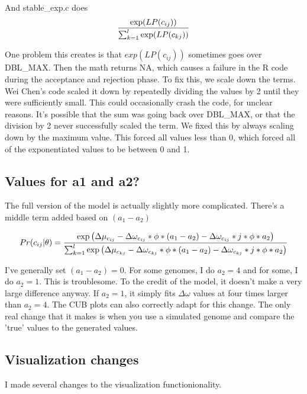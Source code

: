 And stable\_exp.c does
$$\frac{\hbox{exp}(LP(c_{ij}))}{\sum_{k=1}^l \hbox{exp}(LP(c_{kj}))}$$

One problem this creates is that $exp(LP(c_{ij}))$ sometimes goes over DBL\_MAX. Then the math returns NA, which causes a failure in the R code during the acceptance and rejection phase. To fix this, we scale down the terms. Wei Chen's code scaled it down by repeatedly dividing the values by 2  until they were sufficiently small. This could occasionally crash the code, for unclear reasons. It's possible that the sum was going back over DBL\_MAX, or that the division by 2 never successfully scaled the term. We fixed this by always scaling down by the maximum value. This forced all values less than 0, which forced all of the exponentiated values to be between 0 and 1.

\subsection{Values for a1 and a2?}

The full version of the model is actually slightly more complicated. There's a middle term added based on $(a_1 - a_2)$

$$
Pr(c_{ij} | \theta) = 
\frac{\hbox{exp}\left( \Delta\mu_{c_{ij}} - \Delta \omega_{c_{ij}} * \phi * (a_1 - a_2)  - \Delta \omega_{c_{ij}} * j * \phi * a_2\right)}
{\sum_{k=1}^l \hbox{exp}\left( \Delta\mu_{c_{kj}} - \Delta \omega_{c_{kj}} * \phi * (a_1 - a_2)  - \Delta \omega_{c_{kj}} * j * \phi * a_2\right)}
$$

I've generally set $(a_1 - a_2)=0$. For some genomes, I do $a_2=4$ and for some, I do $a_2=1$. This is troublesome. To the credit of the model, it doesn't make a very large difference anyway. If $a_2=1$, it simply fits $\Delta\omega$ values at four times larger than $a_2=4$. The CUB plots can also correctly adapt for this change. The only real change that it makes is when you use a simulated genome and compare the 'true' values to the generated values.


\subsection{Visualization changes}

I made several changes to the visualization functionionality.

